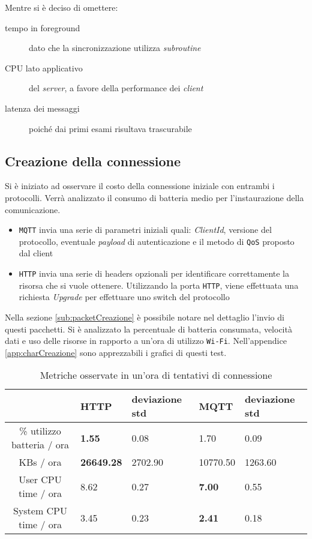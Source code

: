 \bigskip
\noindent
Mentre si è deciso di omettere:
\begin{description}
  \item[tempo in foreground] dato che la sincronizzazione utilizza \textit{subroutine}
  \item[CPU lato applicativo] del \textit{server}, a favore della performance dei \textit{client}
  \item[latenza dei messaggi] poiché dai primi esami risultava trascurabile
\end{description}

\subsection{Creazione della connessione}
\label{sub:comparisonCreazione}

Si è iniziato ad osservare il costo della connessione iniziale con entrambi i protocolli.
Verrà analizzato il consumo di batteria medio per l'instaurazione della comunicazione.

\begin{itemize}
\item \verb+MQTT+ invia una serie di parametri iniziali quali: \textit{ClientId}, versione del protocollo, eventuale \textit{payload} di autenticazione e il metodo di \verb+QoS+ proposto dal client
\item \verb+HTTP+ invia una serie di headers opzionali per identificare correttamente la risorsa che si vuole ottenere. Utilizzando la porta \verb+HTTP+, viene effettuata una richiesta \textit{Upgrade} per effettuare uno switch del protocollo
\end{itemize}

Nella sezione \ref{sub:packetCreazione} è possibile notare nel dettaglio l'invio di questi pacchetti.
Si è analizzato la percentuale di batteria consumata, velocità dati e uso delle risorse in rapporto a un'ora di utilizzo \verb+Wi-Fi+.
Nell'appendice \ref{app:charCreazione} sono apprezzabili i grafici di questi test.

\begin{table}[H]
  \begin{center}
  \begin{tabular}{| c | l | l | l | l |}
    \hline
     & HTTP & deviazione std & MQTT & deviazione std \\ \hline
    \% utilizzo batteria / ora & \textbf{1.55} & 0.08 & 1.70 & 0.09 \\ \hline
    KBs / ora & \textbf{26649.28} & 2702.90 & 10770.50 & 1263.60 \\ \hline
    User CPU time / ora & 8.62 & 0.27 & \textbf{7.00} & 0.55 \\ \hline
    System CPU time / ora & 3.45 & 0.23 & \textbf{2.41} & 0.18 \\ \hline
  \end{tabular}
  \label{tab:comparisonCreazione2}
  \caption{Metriche osservate in un'ora di tentativi di connessione}
  \end{center}
\end{table}

